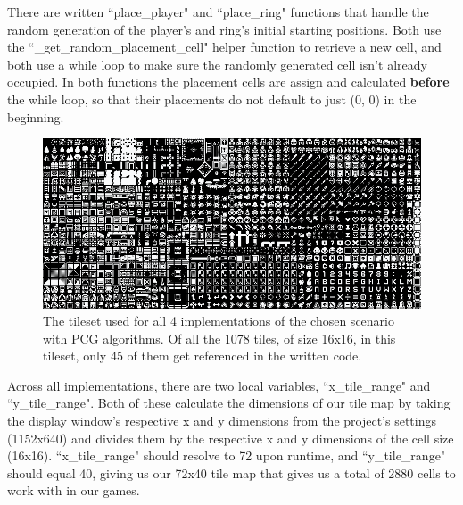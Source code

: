 There are written ``place\_player" and ``place\_ring" functions that handle the random generation of the player's and ring's initial starting positions. Both use the ``\_get\_random\_placement\_cell" helper function to retrieve a new cell, and both use a while loop to make sure the randomly generated cell isn't already occupied. In both functions the placement cells are assign and calculated \textbf{before} the while loop, so that their placements do not default to just (0, 0) in the beginning.

\begin{figure}[H]
    \centering
    \includegraphics[width=\textwidth]{Images/monochrome_packed.png}
    \caption{The tileset used for all 4 implementations of the chosen scenario with PCG algorithms.\cite{kenneyassetsused} Of all the 1078 tiles, of size 16x16, in this tileset, only 45 of them get referenced in the written code.}
    \label{fig:kenneyset}
\end{figure}

Across all implementations, there are two local variables, ``x\_tile\_range" and ``y\_tile\_range". Both of these calculate the dimensions of our tile map by taking the display window's respective x and y dimensions from the project's settings (1152x640) and divides them by the respective x and y dimensions of the cell size (16x16). ``x\_tile\_range" should resolve to 72 upon runtime, and ``y\_tile\_range" should equal 40, giving us our 72x40 tile map that gives us a total of 2880 cells to work with in our games.

